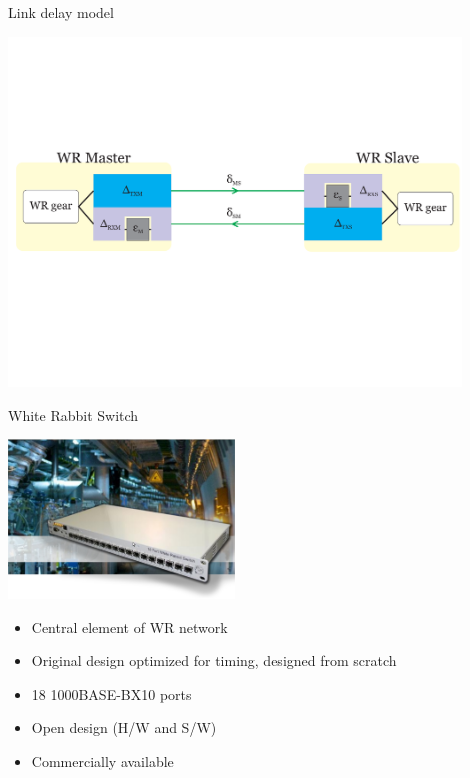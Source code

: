 \documentclass[compress, red]{beamer}
\begin{document}
\begin{frame}{Link delay model}
 \begin{center}
   \includegraphics[width=0.9\textwidth]{../../figures/protocol/link-model.pdf}
   \end{center}
\end{frame}

\begin{frame}{White Rabbit Switch}

    \begin{center}
     \includegraphics[width=6.0cm]{../../figures/switch/wrSwitchV3.jpg}
    \end{center}
	\begin{itemize}
	\item Central element of WR network
	\item Original design optimized for timing, designed from scratch
	\item 18 1000BASE-BX10 ports
	\item Open design (H/W and S/W) 
	\item Commercially available
	\end{itemize}
\end{frame}
\end{document}
